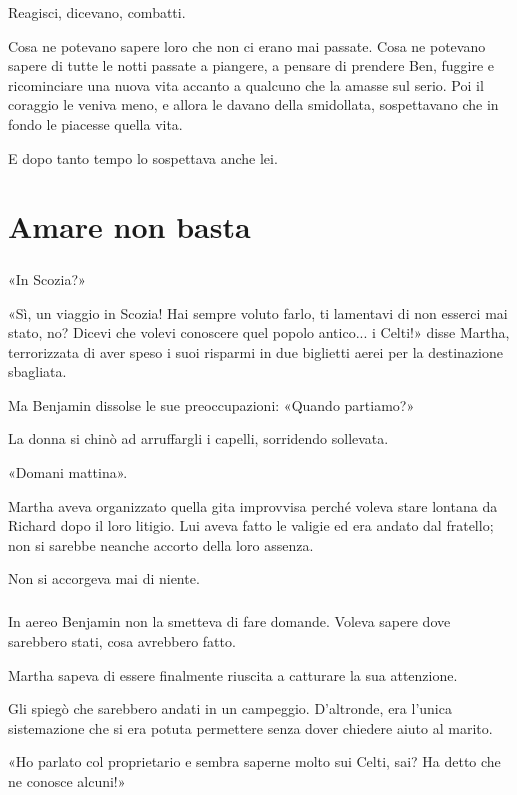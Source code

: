 \documentclass[a4paper,12pt]{book}
\begin{document}
Reagisci, dicevano, combatti.

Cosa ne potevano sapere loro che non ci erano mai passate. Cosa ne potevano
sapere di tutte le notti passate a piangere, a pensare di prendere Ben, fuggire
e ricominciare una nuova vita accanto a qualcuno che la amasse sul serio. Poi il
coraggio le veniva meno, e allora le davano della smidollata, sospettavano che
in fondo le piacesse quella vita.

E dopo tanto tempo lo sospettava anche lei.

\chapter{Amare non basta}

\paragraph{}
«In Scozia?»

«Sì, un viaggio in Scozia! Hai sempre voluto farlo, ti lamentavi di non
esserci mai stato, no? Dicevi che volevi conoscere quel popolo antico... i
Celti!» disse Martha, terrorizzata di aver speso i suoi risparmi in due
biglietti aerei per la destinazione sbagliata.

Ma Benjamin dissolse le sue preoccupazioni: «Quando partiamo?»

La donna si chinò ad arruffargli i capelli, sorridendo sollevata.

«Domani mattina».

Martha aveva organizzato quella gita improvvisa perché voleva stare lontana da
Richard dopo il loro litigio. Lui aveva fatto le valigie ed era andato dal
fratello; non si sarebbe neanche accorto della loro assenza.

Non si accorgeva mai di niente.

\paragraph{}
In aereo Benjamin non la smetteva di fare domande. Voleva sapere dove sarebbero
stati, cosa avrebbero fatto.

Martha sapeva di essere finalmente riuscita a catturare la sua attenzione.

Gli spiegò che sarebbero andati in un campeggio. D'altronde, era l'unica
sistemazione che si era potuta permettere senza dover chiedere aiuto al marito.

«Ho parlato col proprietario e sembra saperne molto sui Celti, sai? Ha detto
che ne conosce alcuni!»
\end{document}
